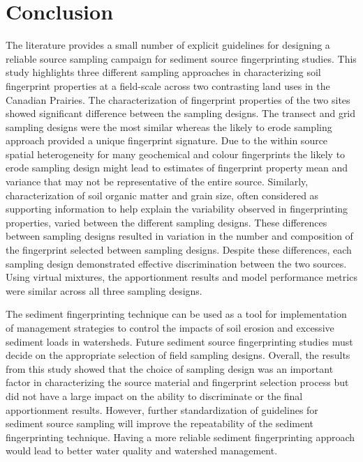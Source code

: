 \documentclass[
  number]{elsarticle}
\begin{document}
\section{Conclusion}\label{conclusion}

The literature provides a small number of explicit guidelines for
designing a reliable source sampling campaign for sediment source
fingerprinting studies. This study highlights three different sampling
approaches in characterizing soil fingerprint properties at a
field-scale across two contrasting land uses in the Canadian Prairies.
The characterization of fingerprint properties of the two sites showed
significant difference between the sampling designs. The transect and
grid sampling designs were the most similar whereas the likely to erode
sampling approach provided a unique fingerprint signature. Due to the
within source spatial heterogeneity for many geochemical and colour
fingerprints the likely to erode sampling design might lead to estimates
of fingerprint property mean and variance that may not be representative
of the entire source. Similarly, characterization of soil organic matter
and grain size, often considered as supporting information to help
explain the variability observed in fingerprinting properties, varied
between the different sampling designs. These differences between
sampling designs resulted in variation in the number and composition of
the fingerprint selected between sampling designs. Despite these
differences, each sampling design demonstrated effective discrimination
between the two sources. Using virtual mixtures, the apportionment
results and model performance metrics were similar across all three
sampling designs.

The sediment fingerprinting technique can be used as a tool for
implementation of management strategies to control the impacts of soil
erosion and excessive sediment loads in watersheds. Future sediment
source fingerprinting studies must decide on the appropriate selection
of field sampling designs. Overall, the results from this study showed
that the choice of sampling design was an important factor in
characterizing the source material and fingerprint selection process but
did not have a large impact on the ability to discriminate or the final
apportionment results. However, further standardization of guidelines
for sediment source sampling will improve the repeatability of the
sediment fingerprinting technique. Having a more reliable sediment
fingerprinting approach would lead to better water quality and watershed
management.
\end{document}
